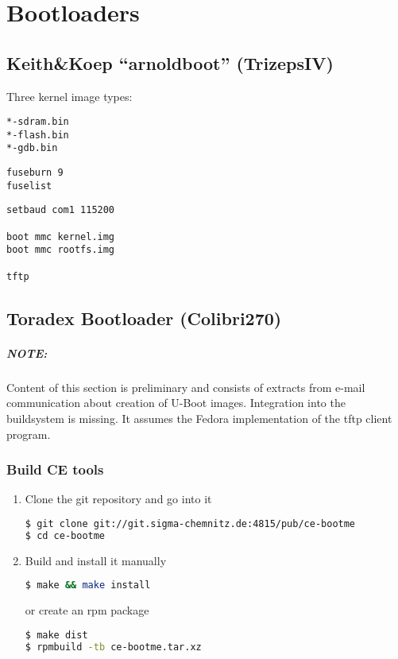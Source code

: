 \chapter{Bootloaders}

\section{Keith\&Koep ``arnoldboot'' (TrizepsIV)}

Three kernel image types:

\begin{description}
\item[\texttt{*-sdram.bin}]
\item[\texttt{*-flash.bin}]
\item[\texttt{*-gdb.bin}]
\end{description}

\begin{verbatim}
fuseburn 9
fuselist
\end{verbatim}



\begin{verbatim}
setbaud com1 115200

boot mmc kernel.img
boot mmc rootfs.img

tftp
\end{verbatim}

\section{Toradex Bootloader (Colibri270)}

\paragraph{NOTE:} Content of this section is preliminary and consists
of extracts from e-mail communication about creation of U-Boot images.
Integration into the buildsystem is missing.  It assumes the Fedora
implementation of the tftp client program.

\subsection{Build CE tools}

\begin{enumerate}
\item Clone the git repository and go into it
\begin{lstlisting}[language=sh]
$ git clone git://git.sigma-chemnitz.de:4815/pub/ce-bootme
$ cd ce-bootme
\end{lstlisting}
\item Build and install it manually
\begin{lstlisting}[language=sh]
$ make && make install
\end{lstlisting}%
or create an rpm package
\begin{lstlisting}[language=sh]
$ make dist
$ rpmbuild -tb ce-bootme.tar.xz
\end{lstlisting}
\end{enumerate}

